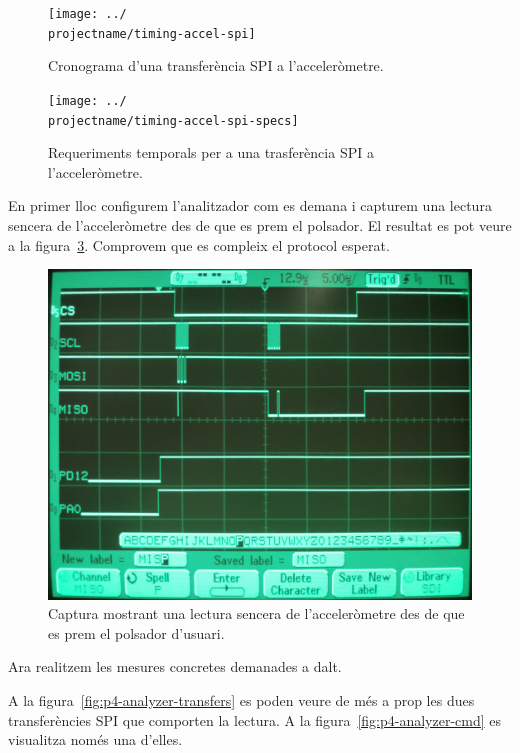 \begin{figure}
  \texttt{[image: ../\\projectname/timing-accel-spi]}
  \caption{ \label{fig:p4-timing-accel} Cronograma d'una transferència SPI a l'acceleròmetre. }
\end{figure}

\begin{figure}
  \texttt{[image: ../\\projectname/timing-accel-spi-specs]}
  \caption{ \label{fig:p4-timing-accel-specs} Requeriments temporals per a una trasferència SPI a l'acceleròmetre. }
\end{figure}

En primer lloc configurem l'analitzador com es demana i capturem una lectura sencera de
l'acceleròmetre des de que es prem el polsador.
El resultat es pot veure a la figura~\ref{fig:p4-analyzer-overview}.
Comprovem que es compleix el protocol esperat.

\begin{figure}
  \includegraphics[width=.99\linewidth]{../photos/analyzer/interrupt-overview}
  \caption{ \label{fig:p4-analyzer-overview} Captura mostrant una lectura sencera de l'acceleròmetre des de que es prem el polsador d'usuari. }
\end{figure}

Ara realitzem les mesures concretes demanades a dalt.

A la figura~\ref{fig:p4-analyzer-transfers}
es poden veure de més a prop les dues transferències SPI que comporten la lectura.
A la figura~\ref{fig:p4-analyzer-cmd} es visualitza només una d'elles.

